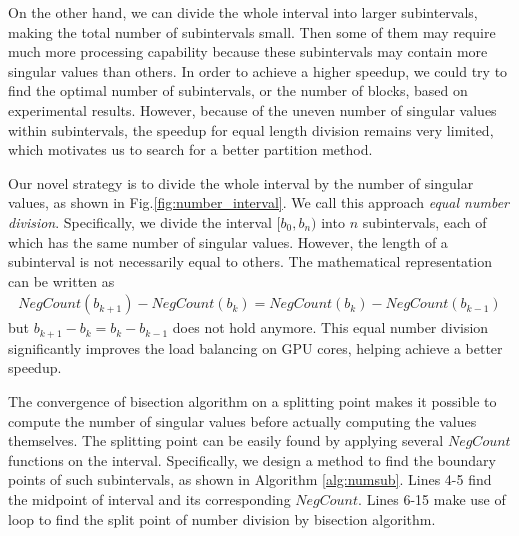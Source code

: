 On the other hand, we can divide the whole interval into larger subintervals, making the total number of subintervals small. 
Then some of them may require much more processing capability
because these subintervals may contain more singular values than others.
In order to achieve a higher speedup, we could try to find the optimal number of subintervals, or the number of blocks, based on experimental results. 
However, because of the uneven number of singular values within subintervals, the speedup for equal length division remains very limited, which motivates us to search for a better partition method.

Our novel strategy is to divide the whole interval by the number of singular values, as shown in Fig.\ref{fig:number_interval}. We call this approach {\it equal number division}. 
Specifically, we divide the interval $[b_0,b_n)$ into $n$ subintervals, each of which has the same number of singular values. 
However, the length of a subinterval is not necessarily equal to others.
The mathematical representation can be written as %
\begin{eqnarray}
NegCount(b_{k+1})-NegCount(b_{k}) = NegCount(b_{k})-NegCount(b_{k-1})
\end{eqnarray}
but $b_{k+1}-b_k = b_{k}-b_{k-1}$ does not hold anymore.
This equal number division significantly improves the load balancing on GPU cores, helping achieve a better speedup.

The convergence of bisection algorithm on a splitting point makes it possible to compute the number of singular values before actually computing
the values themselves. The splitting point can be easily found by applying several $NegCount$ functions on the interval. Specifically, we design a method to find the boundary points of such subintervals, as shown in Algorithm \ref{alg:numsub}.
Lines 4-5 find the midpoint of interval and its corresponding $NegCount$.
Lines 6-15 make use of loop to find the split point of number division by bisection algorithm.



